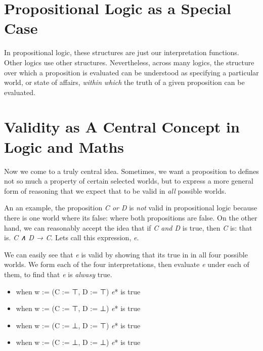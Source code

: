 \documentclass{book}
\providecommand{\tightlist}{%
  \setlength{\itemsep}{0pt}\setlength{\parskip}{0pt}}
\begin{document}
\hypertarget{book__pandoc__debug__src__modeltheory.md__propositional-logic-as-a-special-case}{%
\section*{Propositional Logic as a Special Case}\label{book__pandoc__debug__src__modeltheory.md__propositional-logic-as-a-special-case}}

In propositional logic, these structures are just
our interpretation functions. Other logics use
other structures. Nevertheless, across many logics,
the structure over which a proposition is evaluated
can be understood as specifying a particular world,
or state of affairs, \emph{within which} the truth of a
given proposition can be evaluated.

\hypertarget{book__pandoc__debug__src__modeltheory.md__validity-as-a-central-concept-in-logic-and-maths}{%
\section*{Validity as A Central Concept in Logic and Maths}\label{book__pandoc__debug__src__modeltheory.md__validity-as-a-central-concept-in-logic-and-maths}}

Now we come to a truly central idea. Sometimes, we
want a proposition to defines not so much a property of certain selected worlds, but to express a more general form of reasoning that we expect that to be valid in \emph{all} possible worlds.

An an example, the proposition \emph{C or D} is \emph{not}
valid in propositional logic because there is one
world where it\textquotesingle s false: where both propositions are false. On the other hand, we can reasonably accept the
idea that if \emph{C and D} is true, then \emph{C} is: that is. \emph{C ∧ D → C}. Let\textquotesingle s call this expression, \emph{e}.

We can easily see that \emph{e} is valid by showing that it\textquotesingle s true in in all four possible worlds. We form each of the four interpretations, then evaluate \emph{e} under each of them, to find that \emph{e} is \emph{alwasy} true.

\begin{itemize}
\tightlist
\item
  when w := (C := ⊤, D := ⊤) \emph{e}* is true
\item
  when w := (C := ⊤, D := ⊥) \emph{e}* is true
\item
  when w := (C := ⊥, D := ⊤) \emph{e}* is true
\item
  when w := (C := ⊥, D := ⊥) \emph{e}* is true
\end{itemize}
\end{document}
